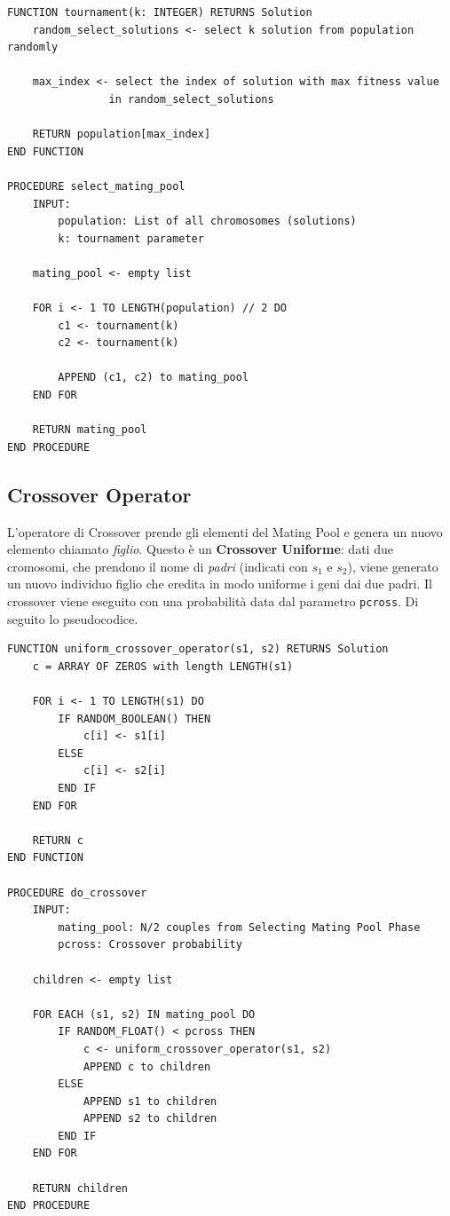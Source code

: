 \begin{lstlisting}[caption={Implementazione del metodo per la selezione del Mating Pool basata sui Tornei.}]
FUNCTION tournament(k: INTEGER) RETURNS Solution
    random_select_solutions <- select k solution from population randomly

    max_index <- select the index of solution with max fitness value
                in random_select_solutions

    RETURN population[max_index]
END FUNCTION

PROCEDURE select_mating_pool
    INPUT:
        population: List of all chromosomes (solutions)
        k: tournament parameter

    mating_pool <- empty list

    FOR i <- 1 TO LENGTH(population) // 2 DO
        c1 <- tournament(k)
        c2 <- tournament(k)

        APPEND (c1, c2) to mating_pool
    END FOR

    RETURN mating_pool
END PROCEDURE
\end{lstlisting}

\subsection{Crossover Operator}
L'operatore di Crossover prende gli elementi del Mating Pool e genera un nuovo
elemento chiamato \textit{figlio}. Questo è un \textbf{Crossover Uniforme}: dati
due cromosomi, che prendono il nome di \textit{padri} (indicati con $s_1$ e
$s_2$), viene generato un nuovo individuo figlio che eredita in modo uniforme i
geni dai due padri. Il crossover viene eseguito con una probabilità data dal
parametro \verb|pcross|. Di seguito lo pseudocodice.

\begin{minipage}{\textwidth}
    \begin{lstlisting}
FUNCTION uniform_crossover_operator(s1, s2) RETURNS Solution
    c = ARRAY OF ZEROS with length LENGTH(s1)

    FOR i <- 1 TO LENGTH(s1) DO
        IF RANDOM_BOOLEAN() THEN
            c[i] <- s1[i]
        ELSE
            c[i] <- s2[i]
        END IF
    END FOR

    RETURN c
END FUNCTION

PROCEDURE do_crossover
    INPUT:
        mating_pool: N/2 couples from Selecting Mating Pool Phase
        pcross: Crossover probability

    children <- empty list

    FOR EACH (s1, s2) IN mating_pool DO
        IF RANDOM_FLOAT() < pcross THEN
            c <- uniform_crossover_operator(s1, s2)
            APPEND c to children
        ELSE
            APPEND s1 to children
            APPEND s2 to children
        END IF
    END FOR

    RETURN children
END PROCEDURE
\end{lstlisting}
\end{minipage}

